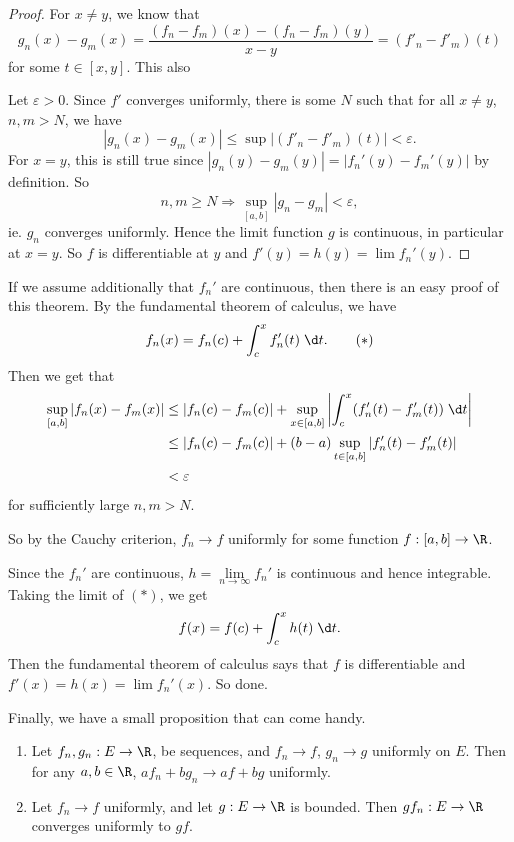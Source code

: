 \documentclass[a4paper]{article}
\begin{document}
\begin{proof}
  For $x \not = y$, we know that
  \[
    g_n(x) - g_m(x) = \frac{(f_n - f_m)(x) - (f_n - f_m)(y)}{x - y} = (f'_n - f'_m)(t)
  \]
  for some $t \in [x, y]$. This also

  Let $\varepsilon > 0$. Since $f'$ converges uniformly, there is some $N$ such that for all $x\not= y$, $n, m > N$, we have
  \[
    |g_n(x) - g_m(x)| \leq \sup |(f'_n - f'_m)(t)| < \varepsilon.
  \]
  For $x = y$, this is still true since $|g_n(y) - g_m(y)| = |f_n'(y) - f_m'(y)|$ by definition. So
  \[
    n, m\geq N \Rightarrow \sup_{[a, b]}|g_n - g_m| < \varepsilon,
  \]
  ie. $g_n$ converges uniformly. Hence the limit function $g$ is continuous, in particular at $x = y$. So $f$ is differentiable at $y$ and $f'(y) = h(y) = \lim f_n'(y)$.
\end{proof}

If we assume additionally that $f_n'$ are continuous, then there is an easy proof of this theorem. By the fundamental theorem of calculus, we have
\[
  f_n(x) = f_n(c) + \int_c^x f_n'(t)\;\d t.\tag{$*$}
\]
Then we get that
\begin{align*}
  \sup_{[a, b]}|f_n(x) - f_m(x)| &\leq |f_n(c) - f_m(c)| + \sup_{x\in [a, b]}\left|\int_c^x (f_n'(t) - f_m'(t))\;\d t\right|\\
  &\leq |f_n(c) - f_m(c)| + (b - a)\sup_{t\in [a, b]}|f_n'(t) - f_m'(t)|\\
  &< \varepsilon
\end{align*}
for sufficiently large $n, m> N$.

So by the Cauchy criterion, $f_n \to f$ uniformly for some function $f: [a, b] \to \R$.

Since the $f_n'$ are continuous, $h = \lim\limits_{n\to \infty} f_n'$ is continuous and hence integrable. Taking the limit of $(*)$, we get
\[
  f(x) = f(c) + \int_c^x h(t)\;\d t.
\]
Then the fundamental theorem of calculus says that $f$ is differentiable and $f'(x) = h(x) = \lim f_n'(x)$. So done.

Finally, we have a small proposition that can come handy.
\begin{prop}\leavevmode
  \begin{enumerate}
    \item Let $f_n, g_n: E\to \R$, be sequences, and $f_n \to f$, $g_n \to g$ uniformly on $E$. Then for any $a, b\in \R$, $af_n + bg_n \to af + bg$ uniformly.
    \item Let $f_n \to f$ uniformly, and let $g: E\to \R$ is bounded. Then $gf_n: E\to \R$ converges uniformly to $gf$.
  \end{enumerate}
\end{prop}
\end{document}
